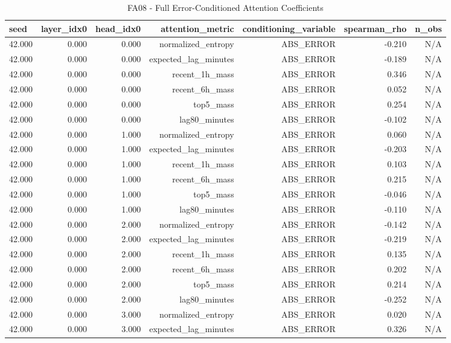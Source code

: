 \begin{table}[h!]
\centering
\caption{FA08 - Full Error-Conditioned Attention Coefficients}
\label{tab:fa08\_-\_full\_error-conditioned\_attention\_coefficients}
\begin{tabular}{lrrrrrr}
\toprule
seed & layer\_idx0 & head\_idx0 & attention\_metric & conditioning\_variable & spearman\_rho & n\_obs \\
\midrule
42.000 & 0.000 & 0.000 & normalized\_entropy & ABS\_ERROR & -0.210 & N/A \\
42.000 & 0.000 & 0.000 & expected\_lag\_minutes & ABS\_ERROR & -0.189 & N/A \\
42.000 & 0.000 & 0.000 & recent\_1h\_mass & ABS\_ERROR & 0.346 & N/A \\
42.000 & 0.000 & 0.000 & recent\_6h\_mass & ABS\_ERROR & 0.052 & N/A \\
42.000 & 0.000 & 0.000 & top5\_mass & ABS\_ERROR & 0.254 & N/A \\
42.000 & 0.000 & 0.000 & lag80\_minutes & ABS\_ERROR & -0.102 & N/A \\
42.000 & 0.000 & 1.000 & normalized\_entropy & ABS\_ERROR & 0.060 & N/A \\
42.000 & 0.000 & 1.000 & expected\_lag\_minutes & ABS\_ERROR & -0.203 & N/A \\
42.000 & 0.000 & 1.000 & recent\_1h\_mass & ABS\_ERROR & 0.103 & N/A \\
42.000 & 0.000 & 1.000 & recent\_6h\_mass & ABS\_ERROR & 0.215 & N/A \\
42.000 & 0.000 & 1.000 & top5\_mass & ABS\_ERROR & -0.046 & N/A \\
42.000 & 0.000 & 1.000 & lag80\_minutes & ABS\_ERROR & -0.110 & N/A \\
42.000 & 0.000 & 2.000 & normalized\_entropy & ABS\_ERROR & -0.142 & N/A \\
42.000 & 0.000 & 2.000 & expected\_lag\_minutes & ABS\_ERROR & -0.219 & N/A \\
42.000 & 0.000 & 2.000 & recent\_1h\_mass & ABS\_ERROR & 0.135 & N/A \\
42.000 & 0.000 & 2.000 & recent\_6h\_mass & ABS\_ERROR & 0.202 & N/A \\
42.000 & 0.000 & 2.000 & top5\_mass & ABS\_ERROR & 0.214 & N/A \\
42.000 & 0.000 & 2.000 & lag80\_minutes & ABS\_ERROR & -0.252 & N/A \\
42.000 & 0.000 & 3.000 & normalized\_entropy & ABS\_ERROR & 0.020 & N/A \\
42.000 & 0.000 & 3.000 & expected\_lag\_minutes & ABS\_ERROR & 0.326 & N/A \\

\end{tabular}
\end{table}
